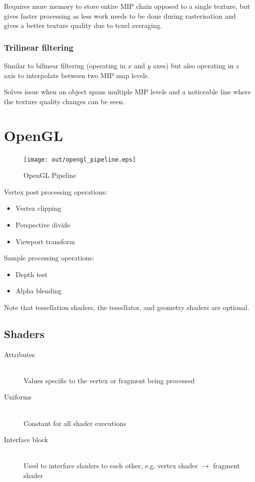 \documentclass[a4paper]{article}
\begin{document}
Requires more memory to store entire MIP chain opposed to a single texture, but
gives faster processing as less work needs to be done during rasterisation and
gives a better texture quality due to texel averaging.

\subsubsection{Trilinear filtering}

Similar to bilinear filtering (operating in $x$ and $y$ axes) but also operating
in $z$ axis to interpolate between two MIP map levels.

Solves issue when an object spans multiple MIP levels and a noticeable line where
the texture quality changes can be seen.

\section{OpenGL}

\begin{figure}[h!]
  \centering
  \texttt{[image: out/opengl\_pipeline.eps]}
  \caption{OpenGL Pipeline}
  \label{fig:opengl_pipeline}
\end{figure}
\FloatBarrier

Vertex post processing operations:

\begin{itemize}
  \item Vertex clipping
  \item Perspective divide
  \item Viewport transform
\end{itemize}

Sample processing operations:

\begin{itemize}
  \item Depth test
  \item Alpha blending
\end{itemize}

Note that tessellation shaders, the tessellator, and geometry shaders are
optional.

\subsection{Shaders}

\begin{description}
  \item[Attributes] \hfill \\
    Values specific to the vertex or fragment being processed
  \item[Uniforms] \hfill \\
    Constant for all shader executions
  \item[Interface block] \hfill \\
    Used to interface shaders to each other, e.g. vertex shader $\rightarrow$
    fragment shader
\end{description}
\end{document}
